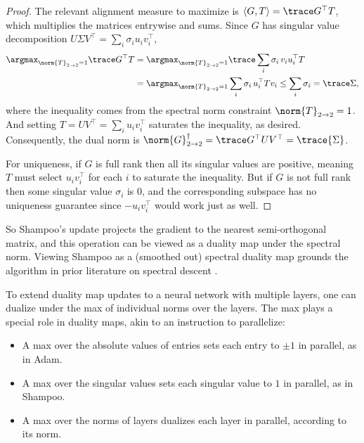 \begin{proof}
    The relevant alignment measure to maximize is $\langle G, T \rangle = \trace G^\top T $, which multiplies the matrices entrywise and sums. Since $G$ has singular value decomposition $U \Sigma V^\top = \sum_i \sigma_i u_i v_i^\top$,
    \begin{align}
        \argmax_{\norm{T}_{2\to 2}=1}\trace G^\top T &= \argmax_{\norm{T}_{2 \to 2}=1} \trace \sum_i \sigma_i \, v_i u_i^\top T \\
        &= \argmax_{\norm{T}_{2 \to 2}=1}\sum_i \sigma_i\, u_i^\top T v_i \leq \sum_i \sigma_i = \trace \Sigma,
    \end{align} where the inequality comes from the spectral norm constraint $\norm{T}_{2 \to 2} = 1$. And setting $T = U V^\top = \sum_i u_i v_i^\top$ saturates the inequality, as desired. Consequently, the dual norm is $\norm{G}_{2 \to 2}^\dagger = \trace G^\top UV^\top = \trace{\Sigma}$.
    
    For uniqueness, if $G$ is full rank then all its singular values are positive, meaning $T$ must select $u_i v_i^\top$ for each $i$ to saturate the inequality. But if $G$ is not full rank then some singular value $\sigma_i$ is 0, and the corresponding subspace has no uniqueness guarantee since $-u_i v_i^\top$ would work just as well.
\end{proof}

So Shampoo's update projects the gradient to the nearest semi-orthogonal matrix, and this operation can be viewed as a duality map under the spectral norm. Viewing Shampoo as a (smoothed out) spectral duality map grounds the algorithm in prior literature on spectral descent \citep{spectral-descent-2,spectral-descent-1,spectral-descent-3}.

To extend duality map updates to a neural network with multiple layers, one can dualize under the max of individual norms over the layers. The max plays a special role in duality maps, akin to an instruction to parallelize:

\begin{itemize}
    \item A max over the absolute values of entries sets each entry to $\pm 1$ in parallel, as in Adam.
    \item A max over the singular values sets each singular value to $1$ in parallel, as in Shampoo.
    \item A max over the norms of layers dualizes each layer in parallel, according to its norm.
\end{itemize}

